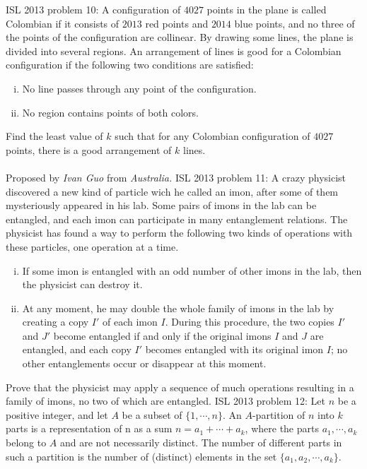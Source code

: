 ISL 2013 problem 10:  A configuration of $4027$ points in the plane is called Colombian if it consists of $2013$ red points and $2014$ blue points, and no three of the points of the configuration are collinear. By drawing some lines, the plane is divided into several regions. An arrangement of lines is good for a Colombian configuration if the following two conditions are satisfied:
\begin{enumerate}[i)]
  \item No line passes through any point of the configuration.
  \item No region contains points of both colors.
\end{enumerate}
Find the least value of $k$ such that for any Colombian configuration of $4027$ points, there is a good arrangement of $k$ lines. \\\\
Proposed by \textit{Ivan Guo} from \textit{Australia.} 
ISL 2013 problem 11:  A crazy physicist discovered a new kind of particle wich he called an imon, after some of them mysteriously appeared in his lab. Some pairs of imons in the lab can be entangled, and each imon can participate in many entanglement relations. The physicist has found a way to perform the following two kinds of operations with these particles, one operation at a time.
\begin{enumerate}[(i)]
  \item If some imon is entangled with an odd number of other imons in the lab, then the physicist can destroy it.
  \item At any moment, he may double the whole family of imons in the lab by creating a copy $I'$ of each imon $I$. During this procedure, the two copies $I'$ and $J'$ become entangled if and only if the original imons $I$ and $J$ are entangled, and each copy $I'$ becomes entangled with its original imon $I$; no other entanglements occur or disappear at this moment.
\end{enumerate}
Prove that the physicist may apply a sequence of much operations resulting in a family of imons, no two of which are entangled. 
ISL 2013 problem 12:  Let $n$ be a positive integer, and let $A$ be a subset of $\{ 1,\cdots ,n\}$. An $A$-partition of $n$ into $k$ parts is a representation of n as a sum $n = a_1 + \cdots + a_k$, where the parts $a_1 , \cdots , a_k $ belong to $A$ and are not necessarily distinct. The number of different parts in such a partition is the number of (distinct) elements in the set $\{ a_1 , a_2 , \cdots , a_k \} $. \\
